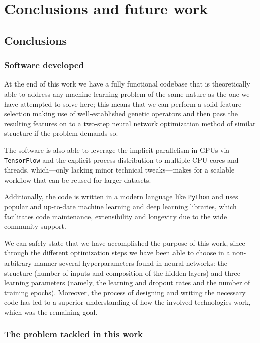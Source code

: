 \chapter{Conclusions and future work}\label{ch:conclusions}

\section{Conclusions}

	\subsection{Software developed}

		At the end of this work we have a fully functional codebase \cite{githubrepo} that is theoretically able to address any machine learning problem of the same nature as the one we have attempted to solve here; this means that we can perform a solid feature selection making use of well-established genetic operators and then pass the resulting features on to a two-step neural network optimization method of similar structure if the problem demands so.

		The software is also able to leverage the implicit parallelism in GPUs via \texttt{TensorFlow} and the explicit process distribution to multiple CPU cores and threads, which---only lacking minor technical tweaks---makes for a scalable workflow that can be reused for larger datasets.

		Additionally, the code is written in a modern language like \texttt{Python} and uses popular and up-to-date machine learning and deep learning libraries, which facilitates code maintenance, extensibility and longevity due to the wide community support.

		We can safely state that we have accomplished the purpose of this work, since through the different optimization steps we have been able to choose in a non-arbitrary manner several hyperparameters found in neural networks: the structure (number of inputs and composition of the hidden layers) and three learning parameters (namely, the learning and dropout rates and the number of training epochs). Moreover, the process of designing and writing the necessary code has led to a superior understanding of how the involved technologies work, which was the remaining goal.

	\subsection{The problem tackled in this work}

